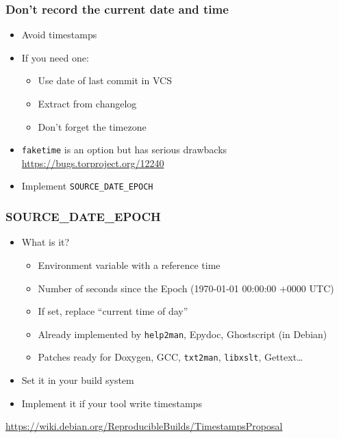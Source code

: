 \documentclass[14pt,aspectratio=169]{beamer}
\begin{document}
\begin{frame}
 \frametitle{Don't record the current date and time}

 \begin{itemize}
  \item Avoid timestamps
  \item<2-> If you need one:
    \begin{itemize}
      \item Use date of last commit in VCS
      \item Extract from changelog
      \item<3-> \alert{Don't forget the timezone}
    \end{itemize}
  \item<4-> \texttt{faketime} is an option but has serious drawbacks \\
    {\small \url{https://bugs.torproject.org/12240}}
  \item<5> Implement \texttt{SOURCE\_DATE\_EPOCH}
 \end{itemize}
\end{frame}

\begin{frame}
 \frametitle{SOURCE\_DATE\_EPOCH}

 \begin{itemize}
   \item What is it?
     \begin{itemize}
       \item Environment variable with a reference time
       \item Number of seconds since the Epoch (1970-01-01 00:00:00 +0000 UTC)
       \item If set, replace “current time of day”
       \item Already implemented by \texttt{help2man}, Epydoc, Ghostscript (in Debian)
       \item Patches ready for Doxygen, GCC, \texttt{txt2man}, \texttt{libxslt}, Gettext…
     \end{itemize}
   \item Set it in your build system
   \item Implement it if your tool write timestamps
 \end{itemize}

 \begin{center}
   {\small \url{https://wiki.debian.org/ReproducibleBuilds/TimestampsProposal}}
 \end{center}
\end{frame}
\end{document}
